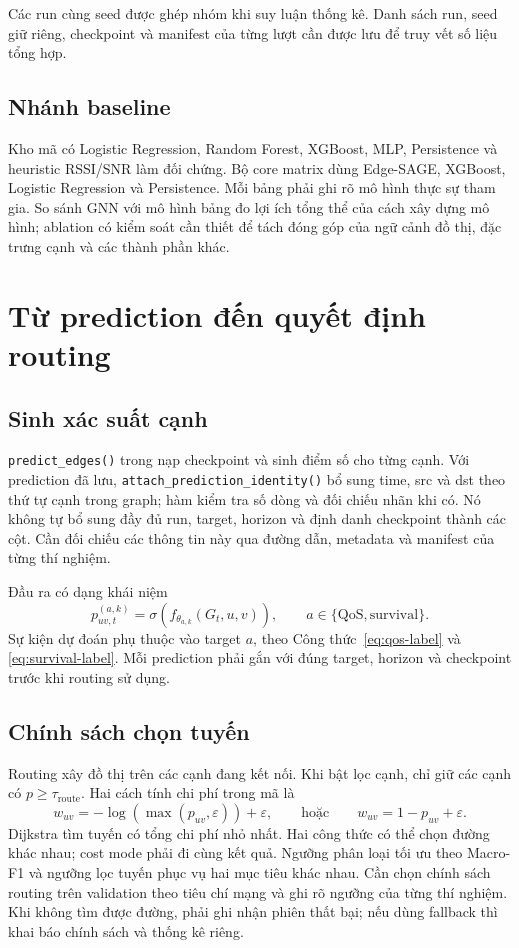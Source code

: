 \documentclass[12pt,a4paper]{article}
\newcommand{\code}[1]{{\small\texttt{#1}}}
\begin{document}
Các run cùng seed được ghép nhóm khi suy luận thống kê. Danh sách run, seed giữ riêng, checkpoint và manifest của từng lượt cần được lưu để truy vết số liệu tổng hợp.

\subsection{Nhánh baseline}

Kho mã có Logistic Regression, Random Forest, XGBoost, MLP, Persistence và heuristic RSSI/SNR làm đối chứng. Bộ core matrix dùng Edge-SAGE, XGBoost, Logistic Regression và Persistence. Mỗi bảng phải ghi rõ mô hình thực sự tham gia. So sánh GNN với mô hình bảng đo lợi ích tổng thể của cách xây dựng mô hình; ablation có kiểm soát cần thiết để tách đóng góp của ngữ cảnh đồ thị, đặc trưng cạnh và các thành phần khác.

\section{Từ prediction đến quyết định routing}
\label{sec:routing}

\subsection{Sinh xác suất cạnh}

\code{predict\_edges()} trong  nạp checkpoint và sinh điểm số cho từng cạnh. Với prediction đã lưu, \code{attach\_prediction\_identity()} bổ sung time, src và dst theo thứ tự cạnh trong graph; hàm kiểm tra số dòng và đối chiếu nhãn khi có. Nó không tự bổ sung đầy đủ run, target, horizon và định danh checkpoint thành các cột. Cần đối chiếu các thông tin này qua đường dẫn, metadata và manifest của từng thí nghiệm.

Đầu ra có dạng khái niệm
\[
  p^{(a,k)}_{uv,t}=\sigma\!\left(f_{\theta_{a,k}}(G_t,u,v)\right),
  \qquad a\in\{\mathrm{QoS},\mathrm{survival}\}.
\]
Sự kiện dự đoán phụ thuộc vào target \(a\), theo Công thức~\eqref{eq:qos-label} và \eqref{eq:survival-label}. Mỗi prediction phải gắn với đúng target, horizon và checkpoint trước khi routing sử dụng.

\subsection{Chính sách chọn tuyến}

Routing xây đồ thị trên các cạnh đang kết nối. Khi bật lọc cạnh, chỉ giữ các cạnh có \(p\geq\tau_{\mathrm{route}}\). Hai cách tính chi phí trong mã là
\[
 w_{uv}=-\log\!\left(\max(p_{uv},\varepsilon)\right)+\varepsilon,
 \qquad\text{hoặc}\qquad
 w_{uv}=1-p_{uv}+\varepsilon.
\]
Dijkstra tìm tuyến có tổng chi phí nhỏ nhất. Hai công thức có thể chọn đường khác nhau; cost mode phải đi cùng kết quả. Ngưỡng phân loại tối ưu theo Macro-F1 và ngưỡng lọc tuyến phục vụ hai mục tiêu khác nhau. Cần chọn chính sách routing trên validation theo tiêu chí mạng và ghi rõ ngưỡng của từng thí nghiệm. Khi không tìm được đường, phải ghi nhận phiên thất bại; nếu dùng fallback thì khai báo chính sách và thống kê riêng.
\end{document}
